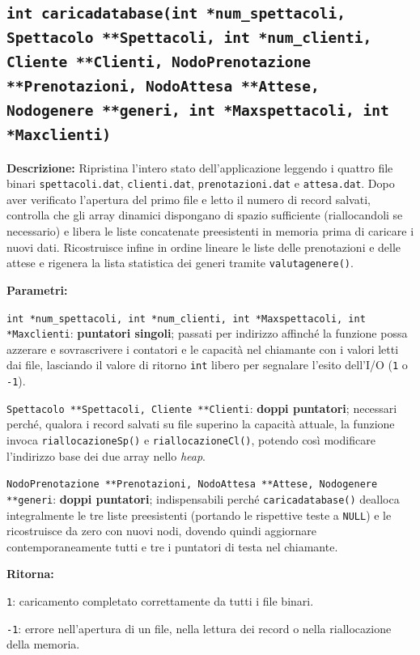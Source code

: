 \documentclass[11pt,a4paper,oneside,openany]{book}
\newenvironment{listacomp}{%
    \small
    \begin{list}{\textendash}{%
        \setlength{\topsep}{2pt}%
        \setlength{\partopsep}{0pt}%
        \setlength{\itemsep}{1pt}%
        \setlength{\parsep}{0pt}%
        \setlength{\leftmargin}{1.2em}%
    }%
}{%
    \end{list}%
}
\begin{document}
\subsection[caricadatabase()]{\texttt{int caricadatabase(int *num\_spettacoli, Spettacolo **Spettacoli, int *num\_clienti, Cliente **Clienti, NodoPrenotazione **Prenotazioni, NodoAttesa **Attese, Nodogenere **generi, int *Maxspettacoli, int *Maxclienti)}}\label{sec:caricadatabase}

\noindent\textbf{Descrizione:}
Ripristina l'intero stato dell'applicazione leggendo i quattro file binari \texttt{spettacoli.dat}, \texttt{clienti.dat}, \texttt{prenotazioni.dat} e \texttt{attesa.dat}. Dopo aver verificato l'apertura del primo file e letto il numero di record salvati, controlla che gli array dinamici dispongano di spazio sufficiente (riallocandoli se necessario) e libera le liste concatenate preesistenti in memoria prima di caricare i nuovi dati. Ricostruisce infine in ordine lineare le liste delle prenotazioni e delle attese e rigenera la lista statistica dei generi tramite \texttt{valutagenere()}.

\noindent\textbf{Parametri:}
\begin{listacomp}
    \item \texttt{int *num\_spettacoli, int *num\_clienti, int *Maxspettacoli, int *Maxclienti}: \textbf{puntatori singoli}; passati per indirizzo affinché la funzione possa azzerare e sovrascrivere i contatori e le capacità nel chiamante con i valori letti dai file, lasciando il valore di ritorno \texttt{int} libero per segnalare l'esito dell'I/O (\texttt{1} o \texttt{-1}).
    \item \texttt{Spettacolo **Spettacoli, Cliente **Clienti}: \textbf{doppi puntatori}; necessari perché, qualora i record salvati su file superino la capacità attuale, la funzione invoca \texttt{riallocazioneSp()} e \texttt{riallocazioneCl()}, potendo così modificare l'indirizzo base dei due array nello \emph{heap}.
    \item \texttt{NodoPrenotazione **Prenotazioni, NodoAttesa **Attese, Nodogenere **generi}: \textbf{doppi puntatori}; indispensabili perché \texttt{caricadatabase()} dealloca integralmente le tre liste preesistenti (portando le rispettive teste a \texttt{NULL}) e le ricostruisce da zero con nuovi nodi, dovendo quindi aggiornare contemporaneamente tutti e tre i puntatori di testa nel chiamante.
\end{listacomp}

\noindent\textbf{Ritorna:}
\begin{listacomp}
    \item \texttt{1}: caricamento completato correttamente da tutti i file binari.
    \item \texttt{-1}: errore nell'apertura di un file, nella lettura dei record o nella riallocazione della memoria.
\end{listacomp}
\end{document}
